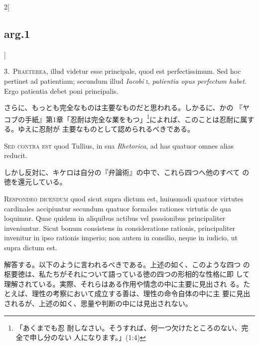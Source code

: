 \documentclass[paper=a4paper,fontsize=10pt,jafontsize=9pt,titlepage]{jlreq}
\begin{document}
\begin{paracol}{2}[\subsection{arg.1}]

3.~{\scshape Praeterea}, illud videtur esse principale, quod est
perfectissimum. Sed hoc pertinet ad patientiam; secundum illud
{\itshape Iacobi} {\scshape i}, {\itshape patientia opus perfectum
habet}. Ergo patientia debet poni principalis.

\switchcolumn

さらに、もっとも完全なものは主要なものだと思われる。しかるに、かの
 『ヤコブの手紙』第1章「忍耐は完全な業をもつ」\footnote{「あくまでも忍
 耐しなさい。そうすれば、何一つ欠けたところのない、完全で申し分のない
 人になります。」(1:4)}によれば、このことは忍耐に属する。ゆえに忍耐が
 主要なものとして認められるべきである。

\switchcolumn*[\subsection{s.c.}]

{\scshape Sed contra est} quod Tullius, in sua {\itshape Rhetorica},
 ad has quatuor omnes alias reducit.

\switchcolumn

しかし反対に、キケロは自分の『弁論術』の中で、これら四つへ他のすべて
 の徳を還元している。


{\scshape Respondeo dicendum} quod sicut supra dictum est, huiusmodi
 quatuor virtutes cardinales accipiuntur secundum quatuor formales
 rationes virtutis de qua loquimur. Quae quidem in aliquibus actibus
 vel passionibus principaliter inveniuntur. Sicut bonum consistens in
 consideratione rationis, principaliter invenitur in ipso rationis
 imperio; non autem in consilio, neque in iudicio, ut supra dictum
 est.

\switchcolumn

解答する。以下のように言われるべきである。上述の如く、このような四つ
 の枢要徳は、私たちがそれについて語っている徳の四つの形相的な性格に即
 して理解されている。実際、それらはある作用や情念の中に主要に見出され
 る。たとえば、理性の考察において成立する善は、理性の命令自体の中に主
 要に見出されるが、上述の如く、思量や判断の中には見出されない。


\end{paracol}
\end{document}
